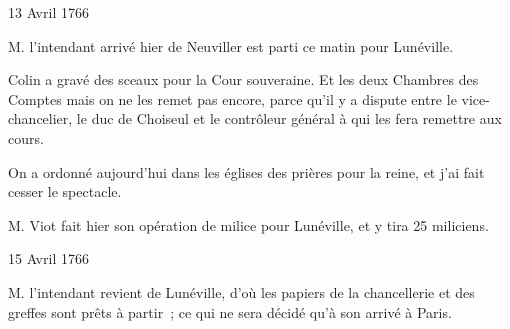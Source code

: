                      \begin{diary}{13 Avril 1766}{}
                        
                        
                           M. l'intendant arrivé hier de
                              Neuviller
                           est parti ce matin pour Lunéville. \bigskip
        
        
                        
                           Colin a gravé des sceaux pour la
                              Cour souveraine.
                           Et les deux Chambres des Comptes mais on
                           ne les remet pas encore, parce qu'il y a
                           dispute entre le
                              vice-chancelier, le
                              duc de Choiseul et le contrôleur général à qui
                           les fera remettre aux cours. \bigskip
        
        
                         On a ordonné aujourd'hui dans les
                           églises des prières pour la reine,
                           et j'ai fait cesser le spectacle. \bigskip
        
        
                        
                           M. Viot fait hier son opération de
                           milice pour Lunéville, et
                           y tira 25
                           miliciens. \bigskip
        
        
                     \end{diary}

                     \begin{diary}{15 Avril 1766}{}
                        
                        
                           M. l'intendant revient de
                              Lunéville, d'où
                           les papiers de la
                              chancellerie et des greffes
                           sont prêts à partir ; ce qui ne sera décidé
                           qu'à son arrivé à Paris. \bigskip
        
        
                     \end{diary}
                     
